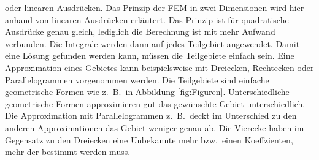 oder linearen Ausdrücken.
Das Prinzip der FEM in zwei Dimensionen wird hier anhand von linearen
Ausdrücken erläutert.
Das Prinzip ist für quadratische Ausdrücke genau gleich, lediglich
die Berechnung ist mit mehr Aufwand verbunden.
Die Integrale werden dann auf jedes Teilgebiet angewendet. 
Damit eine Lösung gefunden werden kann, müssen die Teilgebiete einfach sein.
Eine Approximation eines Gebietes kann beispielsweise mit Dreiecken,
Rechtecken oder Parallelogrammen vorgenommen werden.
Die Teilgebiete sind einfache geometrische Formen wie z.~B.~in
Abbildung \ref{fig:Figuren}.
Unterschiedliche geometrische Formen approximieren gut das gewünschte
Gebiet unterschiedlich.
Die Approximation mit Parallelogrammen z.~B.~deckt im Unterschied
zu den anderen Approximationen das Gebiet weniger genau ab.
Die Vierecke haben im Gegensatz zu den Dreiecken eine Unbekannte
mehr bzw.~einen Koeffzienten, mehr der bestimmt werden  muss.

